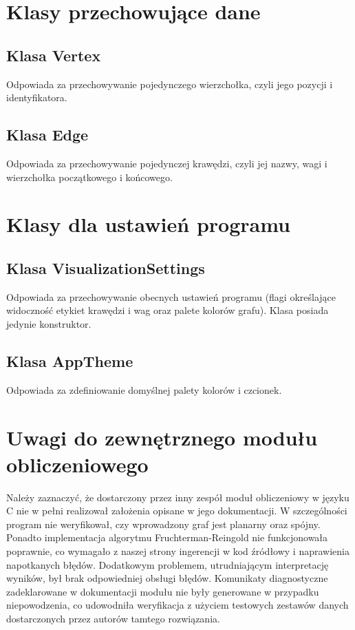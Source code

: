 \documentclass[]{article}
\begin{document}
    \section{Klasy przechowujące dane}

    \subsection{Klasa Vertex} 
    Odpowiada za przechowywanie pojedynczego wierzchołka, czyli jego pozycji i identyfikatora.

    \subsection{Klasa Edge}
    Odpowiada za przechowywanie pojedynczej krawędzi, czyli jej nazwy, wagi i wierzchołka początkowego i końcowego.

    \section{Klasy dla ustawień programu}

    \subsection{Klasa VisualizationSettings}

    Odpowiada za przechowywanie obecnych ustawień programu (flagi określające widoczność etykiet krawędzi i wag oraz palete kolorów grafu). Klasa posiada jedynie konstruktor.

    \subsection{Klasa AppTheme}
    Odpowiada za zdefiniowanie domyślnej palety kolorów i czcionek.

    \section{Uwagi do zewnętrznego modułu obliczeniowego}
    Należy zaznaczyć, że dostarczony przez inny zespół moduł obliczeniowy w języku C nie w pełni realizował założenia opisane w jego dokumentacji. W szczególności program nie weryfikował, czy wprowadzony graf jest planarny oraz spójny. Ponadto implementacja algorytmu Fruchterman-Reingold nie funkcjonowała poprawnie, co wymagało z naszej strony ingerencji w kod źródłowy i naprawienia napotkanych błędów. Dodatkowym problemem, utrudniającym interpretację wyników, był brak odpowiedniej obsługi błędów. Komunikaty diagnostyczne zadeklarowane w dokumentacji modułu nie były generowane w przypadku niepowodzenia, co udowodniła weryfikacja z użyciem testowych zestawów danych dostarczonych przez autorów tamtego rozwiązania.
\end{document}
